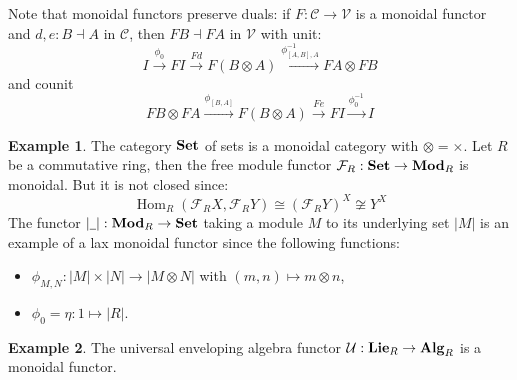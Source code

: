 \documentclass[8pt]{article}
\theoremstyle{definition}
\theoremstyle{definition}
\theoremstyle{definition}
\theoremstyle{definition}
\theoremstyle{definition}
\theoremstyle{definition}
\theoremstyle{definition}
\theoremstyle{definition}
\theoremstyle{definition}
\theoremstyle{definition}
\theoremstyle{definition}
\theoremstyle{definition}
\newtheorem{example}{Example}[section]
\theoremstyle{definition}
\theoremstyle{definition}
\theoremstyle{question}
\begin{document}
  Note that monoidal functors preserve duals: if $F : \mathcal{C} \to \mathcal{V}$ is a monoidal functor and $d, e : B \dashv A$ in $\mathcal{C}$,
  then $F B \dashv F A$ in $\mathcal{V}$ with unit:
  \[
  I \xrightarrow{\phi_0} FI \xrightarrow{F d} F(B \otimes A) \xrightarrow{\phi^{-1}_{[A, B], A}} F A \otimes F B
  \]
  and counit
  \[
  F B \otimes F A \xrightarrow{\phi_{[B,A]}} F(B \otimes A) \xrightarrow{F e} FI \xrightarrow{\phi^{-1}_0} I
  \]

  \begin{example}
    The category ${\bf Set}$ of sets is a monoidal category with $\otimes = \times$. Let $R$ be a commutative ring, then the free module functor 
    $\mathcal{F}_R : {\bf Set} \to {\bf Mod}_R$ is monoidal. But it is not closed since:
    \[
    \operatorname{Hom}_R(\mathcal{F}_R X, \mathcal{F}_R Y) \cong (\mathcal{F}_R Y )^X \not\cong Y^X
    \]
    The functor $|\underline{\:\:}| : {\bf Mod}_R \to {\bf Set}$ taking a module $M$ to its underlying set $|M|$ is an example of a lax monoidal functor since the following functions:
    \begin{itemize}
      \item $\phi_{M,N} : |M| \times |N| \to |M \otimes N|$ with $(m,n) \mapsto m \otimes n$,
      \item $\phi_0 = \eta : 1 \mapsto |R|$.
    \end{itemize} 
  \end{example}

  \begin{example}
    The universal enveloping algebra functor $\mathcal{U} : {\bf Lie}_R \to {\bf Alg}_R$ is a monoidal functor.
  \end{example}
\end{document}
